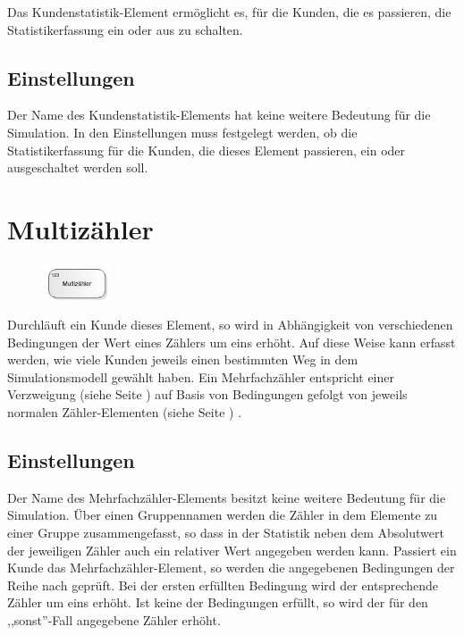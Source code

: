 Das Kundenstatistik-Element ermöglicht es, für die Kunden, die es passieren,
die Statistikerfassung ein oder aus zu schalten.

\subsection*{Einstellungen}

Der Name des Kundenstatistik-Elements hat keine weitere Bedeutung für die Simulation.
In den Einstellungen muss festgelegt werden, ob die Statistikerfassung für die Kunden,
die dieses Element passieren, ein oder ausgeschaltet werden soll.


\section{Multizähler}
\label{ref:ModelElementCounterMulti}

\begin{figure}
\vspace{-22pt}
\includegraphics[width=2cm]{imageModelElementCounterMulti.png}
\vspace{-22pt}
\end{figure}

Durchläuft ein Kunde dieses Element, so wird in Abhängigkeit von verschiedenen Bedingungen
der Wert eines Zählers um eins erhöht. Auf diese Weise kann erfasst werden, wie viele Kunden
jeweils einen bestimmten Weg in dem Simulationsmodell gewählt haben. Ein Mehrfachzähler
entspricht einer Verzweigung (siehe Seite \pageref{ref:ModelElementDecide}) auf Basis von Bedingungen
gefolgt von jeweils normalen Zähler-Elementen (siehe Seite \pageref{ref:ModelElementCounter}) .

\subsection*{Einstellungen}

Der Name des Mehrfachzähler-Elements besitzt keine weitere Bedeutung für die Simulation.
Über einen Gruppennamen werden die Zähler in dem Elemente zu einer Gruppe zusammengefasst,
so dass in der Statistik neben dem Absolutwert der jeweiligen Zähler auch ein relativer
Wert angegeben werden kann. Passiert ein Kunde das Mehrfachzähler-Element, so werden die
angegebenen Bedingungen der Reihe nach geprüft. Bei der ersten erfüllten Bedingung wird
der entsprechende Zähler um eins erhöht. Ist keine der Bedingungen erfüllt, so wird der
für den ,,sonst''-Fall angegebene Zähler erhöht. 


